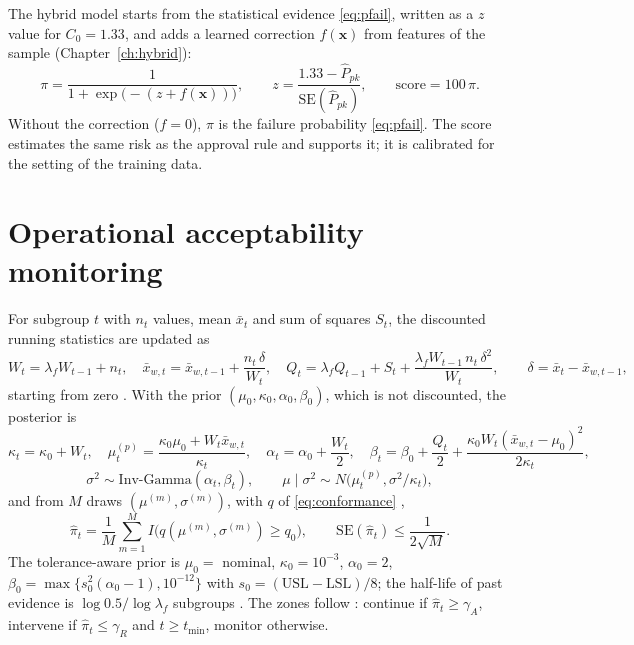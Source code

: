 \documentclass[a4paper,11pt,oneside,openany,parskip=half-,headings=standardclasses,toc=flat,numbers=noenddot]{scrbook}
\newcommand{\chapref}[1]{Chapter~\ref{#1}}
\newcommand{\Ppkhat}{\widehat{P}_{pk}}
\begin{document}
The hybrid model \cite{jy-hybrid} starts from the statistical evidence \eqref{eq:pfail}, written as a $z$ value for
$C_0 = 1.33$, and adds a learned correction $f(\mathbf{x})$ from features of the sample (\chapref{ch:hybrid}):
\begin{equation}\label{eq:uccap-sum}
\pi = \frac{1}{1+\exp\bigl(-(z + f(\mathbf{x}))\bigr)}, \qquad z = \frac{1.33-\Ppkhat}{\mathrm{SE}(\Ppkhat)}, \qquad
\text{score} = 100\,\pi .
\end{equation}
Without the correction ($f = 0$), $\pi$ is the failure probability \eqref{eq:pfail}. The score estimates the same
risk as the approval rule and supports it; it is calibrated for the setting of the training data.

\section{Operational acceptability monitoring}\label{app:f-monitor}

For subgroup $t$ with $n_t$ values, mean $\bar x_t$ and sum of squares $S_t$, the discounted running statistics
are updated as
\begin{equation}\label{eq:mon-update}
W_t = \lambda_f W_{t-1} + n_t, \quad
\bar x_{w,t} = \bar x_{w,t-1} + \frac{n_t\,\delta}{W_t}, \quad
Q_t = \lambda_f Q_{t-1} + S_t + \frac{\lambda_f W_{t-1}\, n_t\, \delta^2}{W_t}, \qquad \delta = \bar x_t - \bar x_{w,t-1},
\end{equation}
starting from zero \cite[Eq.~(24), Algorithm~1]{jy-monitor}. With the prior $(\mu_0, \kappa_0, \alpha_0, \beta_0)$, which is not discounted, the posterior is
\cite[Eqs.~(25), (26)]{jy-monitor}
\begin{equation}\label{eq:mon-post}
\kappa_t = \kappa_0 + W_t,\quad \mu_t^{(p)} = \frac{\kappa_0\mu_0 + W_t\bar x_{w,t}}{\kappa_t},\quad
\alpha_t = \alpha_0 + \frac{W_t}{2},\quad \beta_t = \beta_0 + \frac{Q_t}{2} + \frac{\kappa_0 W_t(\bar x_{w,t}-\mu_0)^2}{2\kappa_t},
\end{equation}
\begin{equation}
\sigma^2 \sim \text{Inv-Gamma}(\alpha_t, \beta_t), \qquad \mu \mid \sigma^2 \sim N\bigl(\mu_t^{(p)}, \sigma^2/\kappa_t\bigr),
\end{equation}
and from $M$ draws $(\mu^{(m)}, \sigma^{(m)})$, with $q$ of \eqref{eq:conformance} \cite[Eqs.~(18), (27), (28)]{jy-monitor},
\begin{equation}\label{eq:mon-pi}
\hat\pi_t = \frac{1}{M}\sum_{m=1}^{M} I\bigl(q(\mu^{(m)}, \sigma^{(m)}) \ge q_0\bigr), \qquad
\mathrm{SE}(\hat\pi_t) \le \frac{1}{2\sqrt M}.
\end{equation}
The tolerance-aware prior is $\mu_0 = $ nominal, $\kappa_0 = 10^{-3}$, $\alpha_0 = 2$,
$\beta_0 = \max\{s_0^2(\alpha_0-1), 10^{-12}\}$ with $s_0 = (\mathrm{USL}-\mathrm{LSL})/8$; the half-life of past
evidence is $\log 0.5/\log\lambda_f$ subgroups \cite[Sec.~4.4]{jy-monitor}. The zones follow \cite[Eqs.~(20), (21)]{jy-monitor}: continue if
$\hat\pi_t \ge \gamma_A$, intervene if $\hat\pi_t \le \gamma_R$ and $t \ge t_{\min}$, monitor otherwise.
\end{document}

